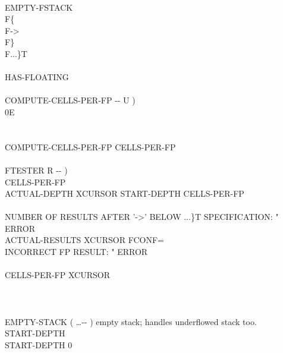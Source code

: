 \begin{tt}
\word[tools]{[ELSE]} \\
\tab \word{:} EMPTY-FSTACK \word{;} \\
\tab \word{:} F\{ \word{;} \\
\tab \word{:} F-> \word{;} \\
\tab \word{:} F\} \word{;} \\
\tab \word{:} F...\}T \word{;} \\
\\
\tab HAS-FLOATING \word[tools]{[IF]} \\
\tab[2]  \\
\tab[2] \word{:} COMPUTE-CELLS-PER-FP  -{}- U ) \\
\tab[3]    0E       \word{-} \word{;} \\
\tab[2]  \\
\\
\tab[2] COMPUTE-CELLS-PER-FP  CELLS-PER-FP \\
\\
\tab[2] \word{:} FTESTER  R -{}- ) \\
\tab[3]   CELLS-PER-FP  \\
\tab[3]  ACTUAL-DEPTH  XCURSOR  START-DEPTH  \word{+} CELLS-PER-FP \word{+}  \\
\tab[3]    \\
\tab[4]    NUMBER OF RESULTS AFTER '->' BELOW ...\}T SPECIFICATION: " \\
\tab[4]   ERROR  \\
\tab[3]   ACTUAL-RESULTS XCURSOR   \word{+}  FCONF=   \\
\tab[4]    INCORRECT FP RESULT: " ERROR \\
\tab[3]    \\
\tab[3]  CELLS-PER-FP XCURSOR \word{+!} \word{;} \\
\tab \word[tools]{[THEN]} \\
\word[tools]{[THEN]} \\
\\
\word{:} EMPTY-STACK	 ( \ldots -{}- ) empty stack; handles underflowed stack too. \\
\tab {} START-DEPTH    \\
\tab[2]  START-DEPTH    0  \\

\end{tt}

